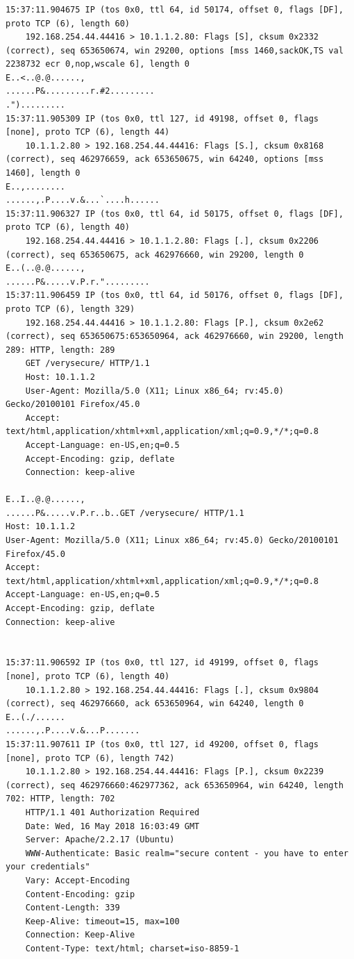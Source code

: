 \documentclass[12pt]{article}
\theoremstyle{plain}
\begin{document}
\subsubsection{}
\begin{lstlisting}
15:37:11.904675 IP (tos 0x0, ttl 64, id 50174, offset 0, flags [DF], proto TCP (6), length 60)
    192.168.254.44.44416 > 10.1.1.2.80: Flags [S], cksum 0x2332 (correct), seq 653650674, win 29200, options [mss 1460,sackOK,TS val 2238732 ecr 0,nop,wscale 6], length 0
E..<..@.@......,
......P&.........r.#2.........
.").........
15:37:11.905309 IP (tos 0x0, ttl 127, id 49198, offset 0, flags [none], proto TCP (6), length 44)
    10.1.1.2.80 > 192.168.254.44.44416: Flags [S.], cksum 0x8168 (correct), seq 462976659, ack 653650675, win 64240, options [mss 1460], length 0
E..,........
......,.P....v.&...`....h......
15:37:11.906327 IP (tos 0x0, ttl 64, id 50175, offset 0, flags [DF], proto TCP (6), length 40)
    192.168.254.44.44416 > 10.1.1.2.80: Flags [.], cksum 0x2206 (correct), seq 653650675, ack 462976660, win 29200, length 0
E..(..@.@......,
......P&.....v.P.r.".........
15:37:11.906459 IP (tos 0x0, ttl 64, id 50176, offset 0, flags [DF], proto TCP (6), length 329)
    192.168.254.44.44416 > 10.1.1.2.80: Flags [P.], cksum 0x2e62 (correct), seq 653650675:653650964, ack 462976660, win 29200, length 289: HTTP, length: 289
	GET /verysecure/ HTTP/1.1
	Host: 10.1.1.2
	User-Agent: Mozilla/5.0 (X11; Linux x86_64; rv:45.0) Gecko/20100101 Firefox/45.0
	Accept: text/html,application/xhtml+xml,application/xml;q=0.9,*/*;q=0.8
	Accept-Language: en-US,en;q=0.5
	Accept-Encoding: gzip, deflate
	Connection: keep-alive
	
E..I..@.@......,
......P&.....v.P.r..b..GET /verysecure/ HTTP/1.1
Host: 10.1.1.2
User-Agent: Mozilla/5.0 (X11; Linux x86_64; rv:45.0) Gecko/20100101 Firefox/45.0
Accept: text/html,application/xhtml+xml,application/xml;q=0.9,*/*;q=0.8
Accept-Language: en-US,en;q=0.5
Accept-Encoding: gzip, deflate
Connection: keep-alive


15:37:11.906592 IP (tos 0x0, ttl 127, id 49199, offset 0, flags [none], proto TCP (6), length 40)
    10.1.1.2.80 > 192.168.254.44.44416: Flags [.], cksum 0x9804 (correct), seq 462976660, ack 653650964, win 64240, length 0
E..(./......
......,.P....v.&...P.......
15:37:11.907611 IP (tos 0x0, ttl 127, id 49200, offset 0, flags [none], proto TCP (6), length 742)
    10.1.1.2.80 > 192.168.254.44.44416: Flags [P.], cksum 0x2239 (correct), seq 462976660:462977362, ack 653650964, win 64240, length 702: HTTP, length: 702
	HTTP/1.1 401 Authorization Required
	Date: Wed, 16 May 2018 16:03:49 GMT
	Server: Apache/2.2.17 (Ubuntu)
	WWW-Authenticate: Basic realm="secure content - you have to enter your credentials"
	Vary: Accept-Encoding
	Content-Encoding: gzip
	Content-Length: 339
	Keep-Alive: timeout=15, max=100
	Connection: Keep-Alive
	Content-Type: text/html; charset=iso-8859-1
	

\end{lstlisting}
\end{document}

